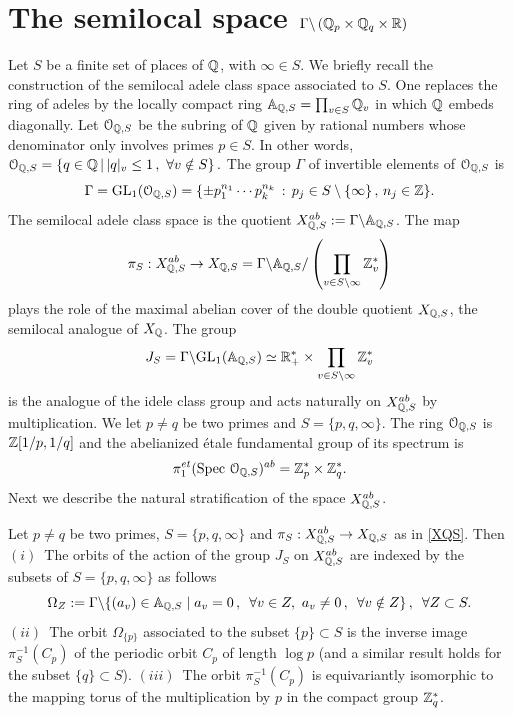 \section{The semilocal space $\Gamma\backslash \left({\mathbb Q}_p\times {\mathbb Q}_q\times \mathbb{R}\right)$}\label{sect3}

Let $S$ be a finite set of places of ${\mathbb Q}$, with $\infty \in S$. We briefly recall the construction of the semilocal adele class space associated to $S$. One replaces the ring of adeles by 
the locally compact ring
$
 {\mathbb A}_{{\mathbb Q},S}=\prod_{v\in S} {\mathbb Q}_v
$
in which  ${\mathbb Q}$  embeds diagonally. Let
${\mathcal O}_{{\mathbb Q},S}$ be the subring of ${\mathbb Q}$ given by rational numbers whose
denominator only involves primes $p \in S$. In other words,
$
 {\mathcal O}_{{\mathbb Q},S}=\{q\in {\mathbb Q}\,|\, |q|_v\leq 1\,,\ \forall v\notin S\}\,.
$
The group $\Gamma$ of invertible elements of  ${\mathcal O}_{{\mathbb Q},S}$ is 
\begin{equation}\label{GL1QS}
\Gamma={\rm GL}_1({\mathcal O}_{{\mathbb Q},S})= \{ \pm p_1^{n_1} \cdots p_k^{n_k} \, :\,  p_j
\in S \setminus\{ \infty \} \,,\, n_j\in \mathbb{Z}\}.
\end{equation}
The semilocal adele  class space 
 is the quotient $X_{{\mathbb Q},S}^{ab}:=\Gamma\backslash{\mathbb A}_{{\mathbb Q},S}$. The map  
\begin{equation}\label{XQS}
\pi_S:X_{{\mathbb Q},S}^{ab}\to X_{{\mathbb Q},S}=\Gamma\backslash{\mathbb A}_{{\mathbb Q},S}/\left(\prod_{v\in S\setminus \infty}\mathbb{Z}_v^*\right)
\end{equation}
 plays the role of the maximal abelian cover of the  double quotient $X_{{\mathbb Q},S}$, the semilocal analogue  of $X_{\mathbb Q}$. 
The group 
\begin{equation}\label{JS} J_S=\Gamma\backslash{\rm GL}_1({\mathbb A}_{{\mathbb Q},S})\simeq \mathbb{R}_+^*\times  \prod_{v\in S\setminus \infty}\mathbb{Z}_v^*
\end{equation}
is the analogue of the idele class group and acts naturally on  $X_{{\mathbb Q},S}^{ab}$ by multiplication.\newline
We let $p\neq q$ be two primes and  $S=\{ p, q,\infty \}$. The ring ${\mathcal O}_{{\mathbb Q},S}$
is $\mathbb{Z}[1/p,1/q]$ and the  abelianized \'etale fundamental group of its spectrum  is 
\begin{equation}\label{pi1}
\pi_1^{e t}({\rm Spec\,} \, {\mathcal O}_{{\mathbb Q},S})^{ab}=\mathbb{Z}_p^*\times \mathbb{Z}_q^*.
\end{equation}
Next we describe the natural stratification of the space $X_{{\mathbb Q},S}^{ab}$.
\begin{prop}\label{ergodic23} Let $p\neq q$ be two primes,  $S=\{ p, q,\infty \}$ and $\pi_S:X_{{\mathbb Q},S}^{ab}\to X_{{\mathbb Q},S}$ as in \eqref{XQS}. Then \newline
$(i)$~The orbits of the action of the group $J_S$ on $X_{{\mathbb Q},S}^{ab}$ are indexed by the subsets of $S=\{ p, q,\infty \}$ as follows 
$$
\Omega_Z:=\Gamma\backslash\{(a_v)\in {\mathbb A}_{{\mathbb Q},S}\mid a_v= 0\,,\,~\forall v \in Z, \ a_v\neq 0\,,\,~\forall v \notin Z\}\,,\,~\forall Z\subset S.
$$
$(ii)$~The orbit  $\Omega_{\{p\}}$ associated to the subset $\{p\}\subset S$ is  the inverse image $\pi_S^{-1}(C_p)$ of the periodic orbit  $C_p$ of length $\log p$ (and a similar result holds for the subset $\{q\}\subset S$).\newline
$(iii)$~The orbit $\pi_S^{-1}(C_p)$ is equivariantly isomorphic to the mapping torus of the multiplication by $p$ in the compact group $ \mathbb{Z}_q^*$.	
\end{prop}
